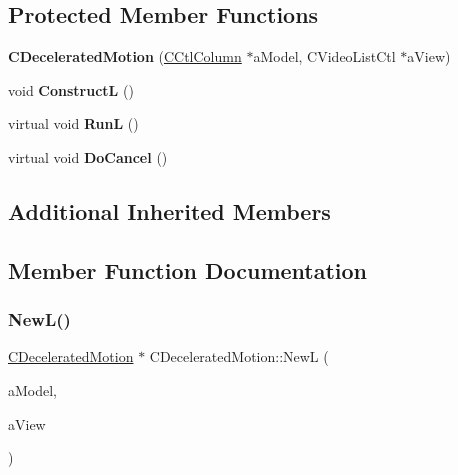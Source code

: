 \subsection*{Protected Member Functions}
\begin{DoxyCompactItemize}
\item 
\mbox{\label{classCDeceleratedMotion_aa7c139e2ecade795a8df53b6d01b1e5b}} 
{\bfseries C\+Decelerated\+Motion} (\hyperlink{classCCtlColumn}{C\+Ctl\+Column} $\ast$a\+Model, C\+Video\+List\+Ctl $\ast$a\+View)
\item 
\mbox{\label{classCDeceleratedMotion_a78ae777217ce1a6f54e64f7c4a855d9f}} 
void {\bfseries ConstructL} ()
\item 
\mbox{\label{classCDeceleratedMotion_a2d36daaec92cd6f34af5a5286648c48d}} 
virtual void {\bfseries RunL} ()
\item 
\mbox{\label{classCDeceleratedMotion_ae6292874608551ec8caa5cc4a9fb6a75}} 
virtual void {\bfseries Do\+Cancel} ()
\end{DoxyCompactItemize}
\subsection*{Additional Inherited Members}


\subsection{Member Function Documentation}
\mbox{\label{classCDeceleratedMotion_afe86cb77999ad4f58a4e555208c1a1f0}} 
\subsubsection{\texorpdfstring{New\+L()}{NewL()}}
{\footnotesize\ttfamily \hyperlink{classCDeceleratedMotion}{C\+Decelerated\+Motion} $\ast$ C\+Decelerated\+Motion\+::\+NewL (\begin{DoxyParamCaption}\item[{\hyperlink{classCCtlColumn}{C\+Ctl\+Column} $\ast$}]{a\+Model,  }\item[{C\+Video\+List\+Ctl $\ast$}]{a\+View }\end{DoxyParamCaption})\hspace{0.3cm}{\ttfamily [static]}}




